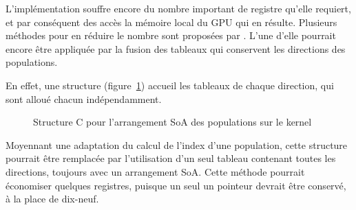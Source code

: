 L'implémentation souffre encore du nombre important de registre qu'elle requiert, et par conséquent des accès la mémoire local du \acs{GPU} qui en résulte. Plusieurs méthodes pour en réduire le nombre sont proposées par \citet{tran_performance_2017}. L'une d'elle pourrait encore être appliquée par la fusion des tableaux qui conservent les directions des populations. 

En effet, une structure (figure~\ref{fig:struct_c_population}) accueil les tableaux de chaque direction, qui sont alloué chacun indépendamment.

\begin{figure}
\centering
\label{fig:struct_c_population}

\caption{Structure C pour l'arrangement \acs{SoA} des populations sur le kernel}
\end{figure}


Moyennant une adaptation du calcul de l'index d'une population, cette structure pourrait être remplacée par l'utilisation d'un seul tableau contenant toutes les directions, toujours avec un arrangement \acs{SoA}. Cette méthode pourrait économiser quelques registres, puisque un seul un pointeur devrait être conservé, à la place de dix-neuf.